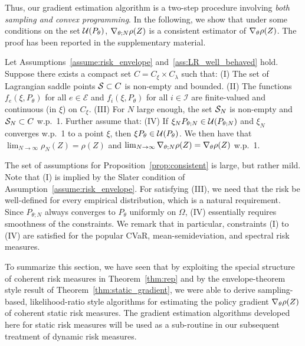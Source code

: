 \documentclass{article} %
\begin{document}
%
Thus, our gradient estimation algorithm is a two-step procedure involving \emph{both sampling and convex programming}. In the following, we show that under some conditions on the set $\mathcal U(P_{\theta})$, $\nabla_{\theta;N}{\rho(Z)}$ is a consistent estimator of $\nabla_{\theta}{\rho(Z)}$. The proof has been reported in the supplementary material.
%
\begin{proposition}\label{prop:consistent}
Let Assumptions~\ref{assume:risk_envelope} and~\ref{ass:LR_well_behaved} hold. Suppose there exists a compact set $C = C_\xi \times C_\lambda$ such that:
(I) The set of Lagrangian saddle points $\mathcal S \subset C$ is non-empty and bounded.
(II) The functions $f_e(\xi,P_\theta)$ for all $e\in\mathcal E$ and $f_i(\xi,P_\theta)$ for all $i\in\mathcal I$ are finite-valued and continuous (in $\xi$) on $C_\xi$.
(III) For $N$ large enough, the set $\mathcal S_{N}$ is non-empty and $\mathcal S_{N} \subset C$ w.p.~1.
Further assume that:
(IV) If $\xi_NP_{\theta;N} \in \mathcal U(P_{\theta;N})$ and $\xi_N$ converges w.p.~1 to a point $\xi$, then $\xi P_{\theta}\in\mathcal U(P_{\theta})$.
We then have that $\lim_{N\to \infty} \rho_N(Z) = \rho(Z) $ and $\lim_{N\to \infty} \nabla_{\theta;N}{\rho(Z)} = \nabla_{\theta}{\rho(Z)} $ w.p.~1.
\end{proposition}
%
The set of assumptions for Proposition~\ref{prop:consistent} is large, but rather mild. Note that (I) is implied by the Slater condition of Assumption~\ref{assume:risk_envelope}. For satisfying (III), we need that the risk be well-defined for every empirical distribution, which is a natural requirement. Since $P_{\theta;N}$ always converges to $P_{\theta}$ uniformly on $\Omega$, (IV) essentially requires smoothness of the constraints. We remark that in particular, constraints (I) to (IV) are satisfied for the popular CVaR, mean-semideviation, and spectral risk measures.

To summarize this section, we have seen that by exploiting the special structure of coherent risk measures in Theorem~\ref{thm:rep} and by the envelope-theorem style result of Theorem~\ref{thm:static_gradient}, we were able to derive sampling-based, likelihood-ratio style algorithms for estimating the policy gradient $\nabla_{\theta}{\rho(Z)}$ of coherent static risk measures. The gradient estimation algorithms developed here for static risk measures will be used as a sub-routine in our subsequent treatment of dynamic risk measures.
\end{document}
